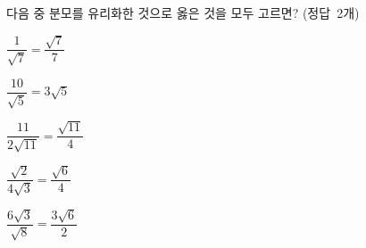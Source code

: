 다음 중 분모를 유리화한 것으로 옳은 것을 모두 고르면? \mbox{(정답 2개)}
\begin{choices32}{\rule[-3ex]{0pt}{8ex}$\dfrac{1}{\sqrt{7}}=\dfrac{\sqrt{7}}{7}$}{\rule[-3ex]{0pt}{8ex}$\dfrac{10}{\sqrt{5}}=3\sqrt{5}$}{\rule[-3ex]{0pt}{8ex}$\dfrac{11}{2\sqrt{11}}=\dfrac{\sqrt{11}}{4}$}{\rule[-3ex]{0pt}{8ex}$\dfrac{\sqrt{2}}{4\sqrt{3}}=\dfrac{\sqrt{6}}{4}$}{\rule[-3ex]{0pt}{8ex}$\dfrac{6\sqrt{3}}{\sqrt{8}}=\dfrac{3\sqrt{6}}{2}$}\end{choices32}
